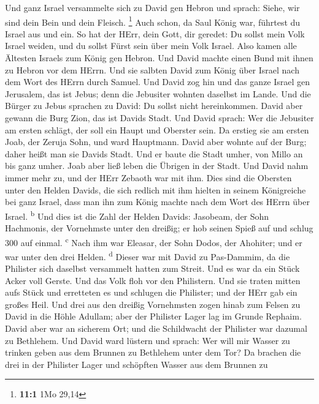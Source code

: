  Und ganz Israel versammelte sich zu David gen Hebron und
sprach: Siehe, wir sind dein Bein und dein Fleisch. \footnote{\textbf{11:1}
  1Mo 29,14}  Auch schon, da Saul König war, führtest du
Israel aus und ein. So hat der HErr, dein Gott, dir geredet: Du sollst
mein Volk Israel weiden, und du sollst Fürst sein über mein Volk Israel.
 Also kamen alle Ältesten Israels zum König gen Hebron.
Und David machte einen Bund mit ihnen zu Hebron vor dem HErrn. Und sie
salbten David zum König über Israel nach dem Wort des HErrn durch
Samuel.  Und David zog hin und das ganze Israel gen
Jerusalem, das ist Jebus; denn die Jebusiter wohnten daselbst im Lande.
 Und die Bürger zu Jebus sprachen zu David: Du sollst
nicht hereinkommen. David aber gewann die Burg Zion, das ist Davids
Stadt.  Und David sprach: Wer die Jebusiter am ersten
schlägt, der soll ein Haupt und Oberster sein. Da erstieg sie am ersten
Joab, der Zeruja Sohn, und ward Hauptmann.  David aber
wohnte auf der Burg; daher heißt man sie Davids Stadt. 
Und er baute die Stadt umher, von Millo an bis ganz umher. Joab aber
ließ leben die Übrigen in der Stadt.  Und David nahm immer
mehr zu, und der HErr Zebaoth war mit ihm.  Dies sind die
Obersten unter den Helden Davids, die sich redlich mit ihm hielten in
seinem Königreiche bei ganz Israel, dass man ihn zum König machte nach
dem Wort des HErrn über Israel. \textsuperscript{b}  Und
dies ist die Zahl der Helden Davids: Jasobeam, der Sohn Hachmonis, der
Vornehmste unter den dreißig; er hob seinen Spieß auf und schlug 300 auf
einmal. \textsuperscript{c}  Nach ihm war Eleasar, der
Sohn Dodos, der Ahohiter; und er war unter den drei Helden.
\textsuperscript{d}  Dieser war mit David zu Pas-Dammim,
da die Philister sich daselbst versammelt hatten zum Streit. Und es war
da ein Stück Acker voll Gerste. Und das Volk floh vor den Philistern.
 Und sie traten mitten aufs Stück und erretteten es und
schlugen die Philister; und der HErr gab ein großes Heil.
 Und drei aus den dreißig Vornehmsten zogen hinab zum
Felsen zu David in die Höhle Adullam; aber der Philister Lager lag im
Grunde Rephaim.  David aber war an sicherem Ort; und die
Schildwacht der Philister war dazumal zu Bethlehem.  Und
David ward lüstern und sprach: Wer will mir Wasser zu trinken geben aus
dem Brunnen zu Bethlehem unter dem Tor?  Da brachen die
drei in der Philister Lager und schöpften Wasser aus dem Brunnen zu
